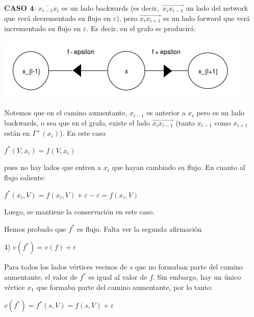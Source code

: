 \documentclass[10pt,a4paper]{article}
\begin{document}
\textbf{CASO 4}: $\overleftarrow{x_{i-1}x_{i}}$ es un lado backwards (es decir, $\overrightarrow{x_{i}x_{i-1}}$ un lado del network que verá decrementado su flujo en $\varepsilon$), pero $\overrightarrow{x_{i}x_{i+1}}$ es un lado forward que verá incrementado su flujo en $\varepsilon$. Es decir, en el grafo se producirá:

\begin{center}

    \begin{adjustbox}{max size={\textwidth}{\textheight}}
        \includegraphics{definitions/f_estrella_5.png}
        \end{adjustbox}
    
\end{center}

Notemos que en el camino aumentante, $x_{i-1}$ es anterior a $x_i$ pero es un lado backwards, o sea que en el grafo, existe el lado $\overrightarrow{x_{i}x_{i-1}}$ (tanto $x_{i-1}$ como $x_{i+1}$ están en $\Gamma^+(x_i)$). En este caso

\begin{center}
$f^*(V, x_i) = f(V, x_i)$
\end{center}

pues no hay lados que entren a $x_i$ que hayan cambiado su flujo. En cuanto al flujo saliente:

\begin{center}
$f^*(x_i, V) = f(x_i, V) + \varepsilon - \varepsilon = f(x_i, V)$
\end{center}

Luego, se mantiene la conservación en este caso.

Hemos probado que $f^*$ es flujo. Falta ver la segunda afirmación

4) $v(f^*) = v(f)+\varepsilon$

Para todos los lados vértices vecinos de $s$ que no formaban parte del camino aumentante, el valor de $f^*$ es igual al valor de $f$. Sin embargo, hay un único vértice $x_1$ que formaba parte del camino aumentante, por lo tanto:

\begin{center}
$v(f^*) = f^*(s, V) = f(s, V) + \varepsilon $
\end{center}
\end{document}

